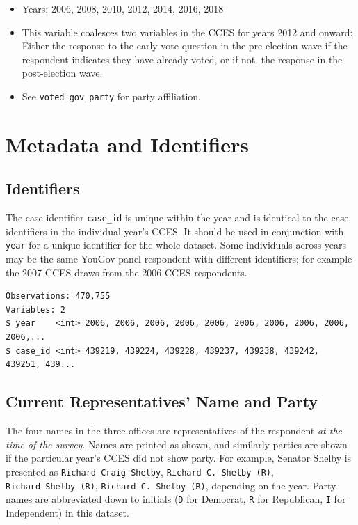 \documentclass[10pt,article,oneside]{memoir}
\theoremstyle{definition}
\begin{document}
\begin{itemize}
\tightlist
\item
  Years: 2006, 2008, 2010, 2012, 2014, 2016, 2018
\item
  This variable coalesces two variables in the CCES for years 2012 and
  onward: Either the response to the early vote question in the
  pre-election wave if the respondent indicates they have already voted,
  or if not, the response in the post-election wave.
\item
  See \texttt{voted\_gov\_party} for party affiliation.
\end{itemize}

\newpage

\hypertarget{metadata-and-identifiers}{%
\section{Metadata and Identifiers}\label{metadata-and-identifiers}}

\hypertarget{identifiers}{%
\subsection{Identifiers}\label{identifiers}}

The case identifier \texttt{case\_id} is unique within the year and is
identical to the case identifiers in the individual year's CCES. It
should be used in conjunction with \texttt{year} for a unique identifier
for the whole dataset. Some individuals across years may be the same
YouGov panel respondent with different identifiers; for example the 2007
CCES draws from the 2006 CCES respondents.

\begin{verbatim}
Observations: 470,755
Variables: 2
$ year    <int> 2006, 2006, 2006, 2006, 2006, 2006, 2006, 2006, 2006, 2006,...
$ case_id <int> 439219, 439224, 439228, 439237, 439238, 439242, 439251, 439...
\end{verbatim}

\hypertarget{current-representatives-name-and-party}{%
\subsection{Current Representatives' Name and
Party}\label{current-representatives-name-and-party}}

The four names in the three offices are representatives of the
respondent \emph{at the time of the survey}. Names are printed as shown,
and similarly parties are shown if the particular year's CCES did not
show party. For example, Senator Shelby is presented as
\texttt{Richard\ Craig\ Shelby}, \texttt{Richard\ C.\ Shelby\ (R)},
\texttt{Richard\ Shelby\ (R)}, \texttt{Richard\ C.\ Shelby\ (R)},
depending on the year. Party names are abbreviated down to initials
(\texttt{D} for Democrat, \texttt{R} for Republican, \texttt{I} for
Independent) in this dataset.
\end{document}
